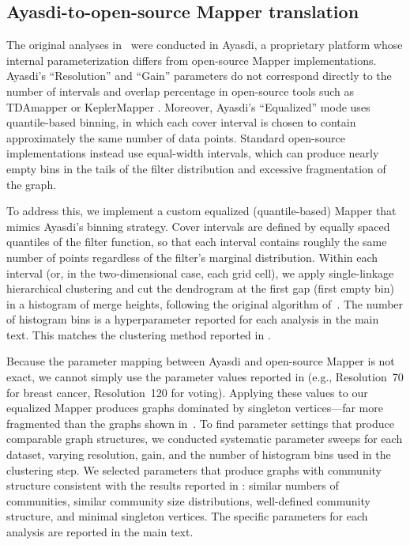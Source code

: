\documentclass[hidelinks]{siamart251216}
\begin{document}
\subsection{Ayasdi-to-open-source Mapper translation}\label{sm:ayasdi}

The original analyses in~\cite{Lum2013} were conducted in Ayasdi, a
proprietary platform whose internal parameterization differs from
open-source Mapper implementations.  Ayasdi's ``Resolution'' and ``Gain''
parameters do not correspond directly to the number of intervals and
overlap percentage in open-source tools such as TDAmapper
\citep{Tauzin2021} or KeplerMapper \citep{vanVeen2019}.  Moreover,
Ayasdi's ``Equalized'' mode uses quantile-based binning, in which each
cover interval is chosen to contain approximately the same number of data
points.  Standard open-source implementations instead use equal-width
intervals, which can produce nearly empty bins in the tails of the filter
distribution and excessive fragmentation of the graph.

To address this, we implement a custom equalized (quantile-based) Mapper
that mimics Ayasdi's binning strategy.  Cover intervals are defined by
equally spaced quantiles of the filter function, so that each interval
contains roughly the same number of points regardless of the filter's
marginal distribution.  Within each interval (or, in the two-dimensional
case, each grid cell), we apply single-linkage hierarchical clustering
and cut the dendrogram at the first gap (first empty bin) in a histogram
of merge heights, following the original algorithm of~\cite{Singh2007}.
The number of histogram bins is a hyperparameter reported for each
analysis in the main text.  This matches the clustering method reported in
\cite{Lum2013}.

Because the parameter mapping between Ayasdi and open-source Mapper is
not exact, we cannot simply use the parameter values reported in
\cite{Lum2013} (e.g., Resolution~70 for breast cancer, Resolution~120
for voting).  Applying these values to our equalized Mapper produces
graphs dominated by singleton vertices---far more fragmented than the
graphs shown in~\cite{Lum2013}.  To find parameter settings that produce
comparable graph structures, we conducted systematic parameter sweeps for
each dataset, varying resolution, gain, and the number of histogram bins
used in the clustering step.  We selected parameters that produce graphs
with community structure consistent with the results reported in
\cite{Lum2013}: similar numbers of communities, similar community size
distributions, well-defined community structure, and minimal singleton
vertices.
The specific parameters for each analysis are reported in the main text.
\end{document}
